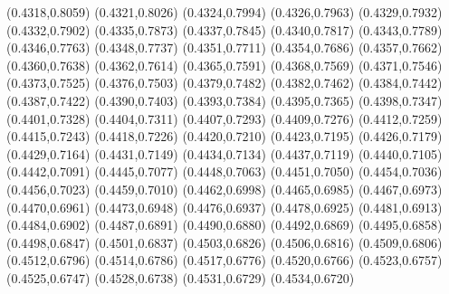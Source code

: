 \PST@Filltriangle(0.4318,0.8059)
\PST@Filltriangle(0.4321,0.8026)
\PST@Filltriangle(0.4324,0.7994)
\PST@Filltriangle(0.4326,0.7963)
\PST@Filltriangle(0.4329,0.7932)
\PST@Filltriangle(0.4332,0.7902)
\PST@Filltriangle(0.4335,0.7873)
\PST@Filltriangle(0.4337,0.7845)
\PST@Filltriangle(0.4340,0.7817)
\PST@Filltriangle(0.4343,0.7789)
\PST@Filltriangle(0.4346,0.7763)
\PST@Filltriangle(0.4348,0.7737)
\PST@Filltriangle(0.4351,0.7711)
\PST@Filltriangle(0.4354,0.7686)
\PST@Filltriangle(0.4357,0.7662)
\PST@Filltriangle(0.4360,0.7638)
\PST@Filltriangle(0.4362,0.7614)
\PST@Filltriangle(0.4365,0.7591)
\PST@Filltriangle(0.4368,0.7569)
\PST@Filltriangle(0.4371,0.7546)
\PST@Filltriangle(0.4373,0.7525)
\PST@Filltriangle(0.4376,0.7503)
\PST@Filltriangle(0.4379,0.7482)
\PST@Filltriangle(0.4382,0.7462)
\PST@Filltriangle(0.4384,0.7442)
\PST@Filltriangle(0.4387,0.7422)
\PST@Filltriangle(0.4390,0.7403)
\PST@Filltriangle(0.4393,0.7384)
\PST@Filltriangle(0.4395,0.7365)
\PST@Filltriangle(0.4398,0.7347)
\PST@Filltriangle(0.4401,0.7328)
\PST@Filltriangle(0.4404,0.7311)
\PST@Filltriangle(0.4407,0.7293)
\PST@Filltriangle(0.4409,0.7276)
\PST@Filltriangle(0.4412,0.7259)
\PST@Filltriangle(0.4415,0.7243)
\PST@Filltriangle(0.4418,0.7226)
\PST@Filltriangle(0.4420,0.7210)
\PST@Filltriangle(0.4423,0.7195)
\PST@Filltriangle(0.4426,0.7179)
\PST@Filltriangle(0.4429,0.7164)
\PST@Filltriangle(0.4431,0.7149)
\PST@Filltriangle(0.4434,0.7134)
\PST@Filltriangle(0.4437,0.7119)
\PST@Filltriangle(0.4440,0.7105)
\PST@Filltriangle(0.4442,0.7091)
\PST@Filltriangle(0.4445,0.7077)
\PST@Filltriangle(0.4448,0.7063)
\PST@Filltriangle(0.4451,0.7050)
\PST@Filltriangle(0.4454,0.7036)
\PST@Filltriangle(0.4456,0.7023)
\PST@Filltriangle(0.4459,0.7010)
\PST@Filltriangle(0.4462,0.6998)
\PST@Filltriangle(0.4465,0.6985)
\PST@Filltriangle(0.4467,0.6973)
\PST@Filltriangle(0.4470,0.6961)
\PST@Filltriangle(0.4473,0.6948)
\PST@Filltriangle(0.4476,0.6937)
\PST@Filltriangle(0.4478,0.6925)
\PST@Filltriangle(0.4481,0.6913)
\PST@Filltriangle(0.4484,0.6902)
\PST@Filltriangle(0.4487,0.6891)
\PST@Filltriangle(0.4490,0.6880)
\PST@Filltriangle(0.4492,0.6869)
\PST@Filltriangle(0.4495,0.6858)
\PST@Filltriangle(0.4498,0.6847)
\PST@Filltriangle(0.4501,0.6837)
\PST@Filltriangle(0.4503,0.6826)
\PST@Filltriangle(0.4506,0.6816)
\PST@Filltriangle(0.4509,0.6806)
\PST@Filltriangle(0.4512,0.6796)
\PST@Filltriangle(0.4514,0.6786)
\PST@Filltriangle(0.4517,0.6776)
\PST@Filltriangle(0.4520,0.6766)
\PST@Filltriangle(0.4523,0.6757)
\PST@Filltriangle(0.4525,0.6747)
\PST@Filltriangle(0.4528,0.6738)
\PST@Filltriangle(0.4531,0.6729)
\PST@Filltriangle(0.4534,0.6720)
